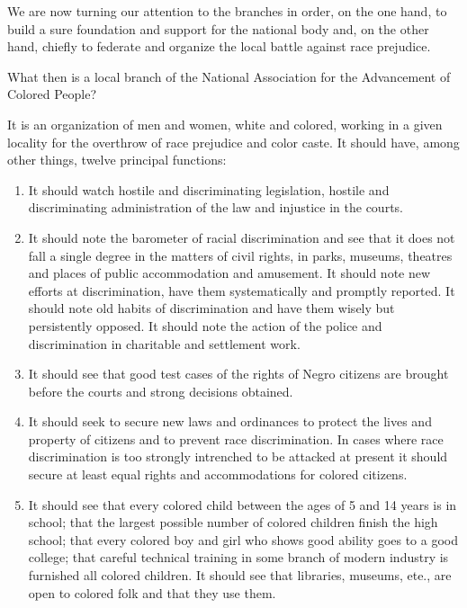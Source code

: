 \documentclass[letterpaper,10pt,english]{jupyterBook}
\begin{document}
\sphinxAtStartPar
We are now turning our attention to the branches in order, on the one hand, to build a sure foundation and support for the national body and, on the other hand, chiefly to federate and organize the local battle against race prejudice.

\sphinxAtStartPar
What then is a local branch of the National Association for the Advancement of Colored People?

\sphinxAtStartPar
It is an organization of men and women, white and colored, working in a given locality for the overthrow of race prejudice and color caste. It should have, among other things, twelve principal functions:
\begin{enumerate}
%
\item {} 
\sphinxAtStartPar
{} It should watch hostile and discriminating legislation, hostile and discriminating administration of the law and injustice in the courts.

\item {} 
\sphinxAtStartPar
{} It should note the barometer of racial discrimination and see that it does not fall a single degree in the matters of civil rights, in parks, museums, theatres and places of public accommodation and amusement. It should note new efforts at discrimination, have them systematically and promptly reported. It should note old habits of discrimination and have them wisely but persistently opposed. It should note the action of the police and discrimination in charitable and settlement work.

\item {} 
\sphinxAtStartPar
{} It should see that good test cases of the rights of Negro citizens are brought before the courts and strong decisions obtained.

\item {} 
\sphinxAtStartPar
{} It should seek to secure new laws and ordinances to protect the lives and property of citizens and to prevent race discrimination. In cases where race discrimination is too strongly intrenched to be attacked at present it should secure at least equal rights and accommodations for colored citizens.

\item {} 
\sphinxAtStartPar
{} It should see that every colored child between the ages of 5 and 14 years is in school; that the largest possible number of colored children finish the high school; that every colored boy and girl who shows good ability goes to a good college; that careful technical training in some branch of modern industry is furnished all colored children.
It should see that libraries, museums, ete., are open to colored folk and that they use them.


\end{enumerate}
\end{document}
